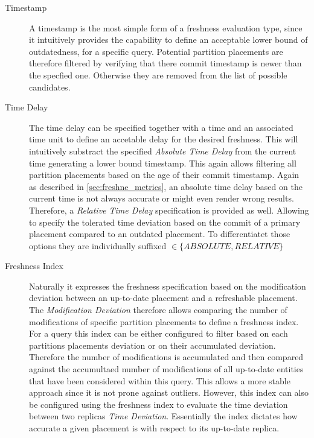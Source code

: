 \begin{description}
    \item[Timestamp] A timestamp is the most simple form of a freshness evaluation type, since it intuitively provides the capability to define 
    an acceptable lower bound of outdatedness, for a specific query. Potential partition placements are therefore filtered by verifying that there commit timestamp is newer
    than the specfied one. Otherwise they are removed from the list of possible candidates.
    
    \item[Time Delay]
    The time delay can be specified together with a time and an associated time unit to define an accetable delay for the desired freshness. 
    This will intuitively substract the specified \emph{Absolute Time Delay} from the current time generating a lower bound timestamp. 
    This again allows filtering all partition placements based on the age of their commit timestamp.
    Again as described in \ref{sec:freshne_metrics}, an absolute time delay based on the current time is not always accurate or might even render wrong results.
    Therefore, a \emph{Relative Time Delay} specification is provided as well. Allowing to specify the tolerated time deviation based on the commit of a primary placement 
    compared to an outdated placement. To differentiatet those options they are individually suffixed $\in \{ABSOLUTE, RELATIVE\}$

    \item[Freshness Index]
    Naturally it expresses the freshness specification based on the modification deviation between an up-to-date placement
    and a refreshable placement. The \emph{Modification Deviation} therefore allows comparing the number of modifications of specific partition placements
    to define a freshness index. For a query this index can be either configured to filter based on each partitions placements deviation or on their accumulated deviation.
    Therefore the number of modifications is accumulated and then compared against the accumultaed number of modifications 
    of all up-to-date entities that have been considered within this query. This allows a more stable approach since it is not prone against outliers. 
    However, this index can also be configured using the freshness index to evaluate the time deviation between two replicas \emph{Time Deviation}. 
    Essentially the index dictates how accurate a given placement is with respect to its up-to-date replica.
    
\end{description}

